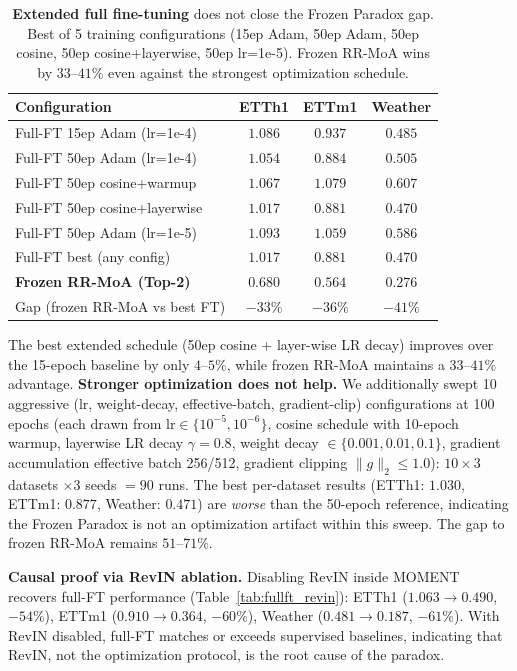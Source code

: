 \documentclass{article}
\begin{document}
\begin{table}[!htbp]
\centering
\caption{\textbf{Extended full fine-tuning} does not close the Frozen Paradox gap. Best of 5 training configurations (15ep Adam, 50ep Adam, 50ep cosine, 50ep cosine+layerwise, 50ep lr=1e-5). Frozen RR-MoA wins by $33$--$41\%$ even against the strongest optimization schedule.}
\label{tab:extended_ft}
\small
\begin{tabular}{@{}lccc@{}}
\toprule
Configuration & ETTh1 & ETTm1 & Weather \\
\midrule
Full-FT 15ep Adam (lr=1e-4) & $1.086$ & $0.937$ & $0.485$ \\
Full-FT 50ep Adam (lr=1e-4) & $1.054$ & $0.884$ & $0.505$ \\
Full-FT 50ep cosine+warmup & $1.067$ & $1.079$ & $0.607$ \\
Full-FT 50ep cosine+layerwise & $\mathbf{1.017}$ & $\mathbf{0.881}$ & $\mathbf{0.470}$ \\
Full-FT 50ep Adam (lr=1e-5) & $1.093$ & $1.059$ & $0.586$ \\
\midrule
Full-FT best (any config) & $1.017$ & $0.881$ & $0.470$ \\
\textbf{Frozen RR-MoA (Top-2)} & $\mathbf{0.680}$ & $\mathbf{0.564}$ & $\mathbf{0.276}$ \\
\midrule
Gap (frozen RR-MoA vs best FT) & $-33\%$ & $-36\%$ & $-41\%$ \\
\bottomrule
\end{tabular}
\end{table}

The best extended schedule (50ep cosine + layer-wise LR decay) improves over the 15-epoch baseline by only $4$--$5\%$, while frozen RR-MoA maintains a $33$--$41\%$ advantage. \textbf{Stronger optimization does not help.} We additionally swept 10 aggressive (lr, weight-decay, effective-batch, gradient-clip) configurations at 100 epochs (each drawn from $\text{lr}{\in}\{10^{-5}, 10^{-6}\}$, cosine schedule with 10-epoch warmup, layerwise LR decay $\gamma{=}0.8$, weight decay ${\in}\{0.001, 0.01, 0.1\}$, gradient accumulation effective batch 256/512, gradient clipping $\|g\|_2 {\leq} 1.0$): $10 \times 3$ datasets $\times 3$ seeds $= 90$ runs. The best per-dataset results (ETTh1: $1.030$, ETTm1: $0.877$, Weather: $0.471$) are \emph{worse} than the 50-epoch reference, indicating the Frozen Paradox is not an optimization artifact within this sweep. The gap to frozen RR-MoA remains $51$--$71\%$.

\textbf{Causal proof via RevIN ablation.} Disabling RevIN inside MOMENT recovers full-FT performance (Table~\ref{tab:fullft_revin}): ETTh1 ($1.063 \to 0.490$, $-54\%$), ETTm1 ($0.910 \to 0.364$, $-60\%$), Weather ($0.481 \to 0.187$, $-61\%$). With RevIN disabled, full-FT matches or exceeds supervised baselines, indicating that RevIN, not the optimization protocol, is the root cause of the paradox.
\end{document}
